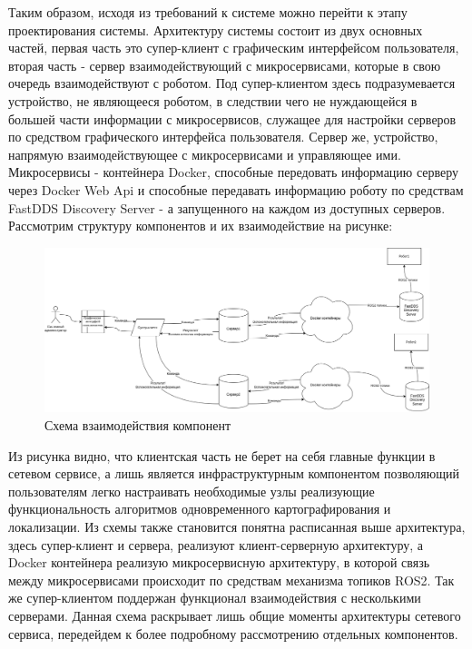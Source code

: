 \documentclass[a4paper, 14pt]{extreport}
\begin{document}
\par Таким образом, исходя из требований к системе можно перейти к этапу проектирования системы. Архитектуру системы состоит из двух 
основных частей, первая часть это супер-клиент с графическим интерфейсом пользователя, вторая часть - сервер взаимодействующий с 
микросервисами, которые в свою очередь взаимодействуют с роботом. Под супер-клиентом здесь подразумевается устройство, не являющееся 
роботом, в следствии чего не нуждающейся в большей части информации с микросервисов, служащее для настройки серверов по средством 
графического интерфейса пользователя. Сервер же, устройство, напрямую взаимодействующее с микросервисами и управляющее ими. 
Микросервисы - контейнера Docker, способные передовать информацию серверу через Docker Web Api и способные передавать информацию роботу
по средствам FastDDS Discovery Server - а запущенного на каждом из доступных серверов. Рассмотрим структуру компонентов и их 
взаимодействие на рисунке:
\newpage
\begin{figure}[ht]
\begin{center}
\includegraphics[scale = 0.35]{./figure/base_architure}
\caption{Схема взаимодействия компонент}
\label{fig:manip_photo}
\end{center}
\end{figure}
\par Из рисунка видно, что клиентская часть не берет на себя главные функции в сетевом сервисе, а лишь является инфраструктурным 
компонентом позволяющий пользователям легко настраивать необходимые узлы реализующие функциональность алгоритмов одновременного
картографирования и локализации. Из схемы также становится понятна расписанная выше архитектура, здесь супер-клиент и сервера, 
реализуют клиент-серверную архитектуру, а Docker контейнера реализую микросервисную архитектуру, в которой связь между микросервисами
происходит по средствам механизма топиков ROS2. Так же супер-клиентом поддержан функционал взаимодействия с несколькими серверами.
Данная схема раскрывает лишь общие моменты архитектуры сетевого сервиса, передейдем к более подробному рассмотрению отдельных 
компонентов.
\end{document}
